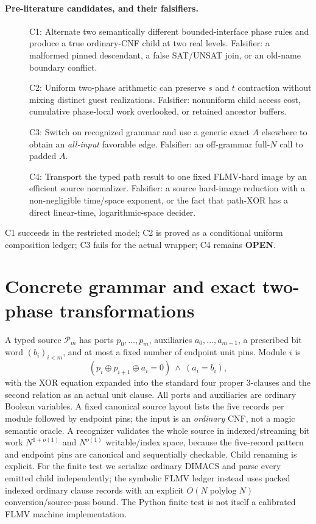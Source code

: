 \documentclass[11pt]{article}
\newcommand{\OPEN}{\textbf{OPEN}}
\begin{document}
\paragraph{Pre-literature candidates, and their falsifiers.}
\begin{description}
\item[] C1: Alternate two semantically different bounded-interface
phase rules and produce a true ordinary-CNF child at two real levels.
Falsifier: a malformed pinned descendant, a false SAT/UNSAT join,
or an old-name boundary conflict.
\item[] C2: Uniform two-phase arithmetic can preserve
$s$ and $t$ contraction without mixing distinct guest realizations.
Falsifier: nonuniform child access cost, cumulative phase-local work
overlooked, or retained ancestor buffers.
\item[] C3: Switch on recognized grammar and use a generic exact
$A$ elsewhere to obtain an \emph{all-input} favorable edge.
Falsifier: an off-grammar full-$N$ call to padded $A$.
\item[] C4: Transport the typed path result to one fixed
FLMV-hard image by an efficient source normalizer.
Falsifier: a source hard-image reduction with a non-negligible
time/space exponent, or the fact that path-XOR has a direct
linear-time, logarithmic-space decider.
\end{description}
C1 succeeds in the restricted model; C2 is proved as a conditional
uniform composition ledger; C3 fails for the actual wrapper; C4
remains \OPEN.

\section{Concrete grammar and exact two-phase transformations}

A typed source $\mathcal{P}_{m}$ has ports
$p_0,\ldots,p_m$, auxiliaries $a_0,\ldots,a_{m-1}$,
a prescribed bit word $(b_i)_{i<m}$, and at most
a fixed number of endpoint unit pins. Module $i$ is
\[
 (p_i\oplus p_{i+1}\oplus a_i=0)\ \land\ (a_i=b_i),
 \tag{2}
\]
with the XOR equation expanded into the standard four
proper 3-clauses and the second relation as an actual unit
clause. All ports and auxiliaries are ordinary Boolean variables.
A fixed canonical source layout lists the five records per
module followed by endpoint pins; the input is an \emph{ordinary}
CNF, not a magic semantic oracle. A recognizer validates
the whole source in indexed/streaming bit work
$N^{1+o(1)}$ and $N^{o(1)}$ writable/index space, because
the five-record pattern and endpoint pins are canonical
and sequentially checkable. Child renaming is explicit.
For the finite test we serialize ordinary DIMACS and
parse every emitted child independently; the symbolic
FLMV ledger instead uses packed indexed ordinary clause
records with an explicit $O(N\operatorname{polylog}N)$
conversion/source-pass bound. The Python finite test
is not itself a calibrated FLMV machine implementation.
\end{document}
